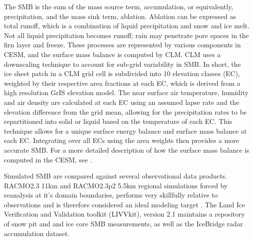 \documentclass[draft]{agujournal2019}
\begin{document}
The SMB is the sum of the mass source term, accumulation, or equivalently, precipitation, and the mass sink term, ablation. Ablation can be expressed as total runoff, which is a combination of liquid precipitation and snow and ice melt. Not all liquid precipitation becomes runoff; rain may penetrate pore spaces in the firn layer and freeze. These processes are represented by various components in CESM, and the surface mass balance is computed by CLM. CLM uses a downscaling technique to account for sub-grid variability in SMB. In short, the ice sheet patch in a CLM grid cell is subdivided into 10 elevation classes (EC), weighted by their respective area fractions at each EC, which is derived from a high resolution GrIS elevation model. The near surface air temperature, humidity and air density are calculated at each EC using an assumed lapse rate and the elevation difference from the grid mean, allowing for the precipitation rates to be repartitioned into solid or liquid based on the temperature of each EC. This technique allows for a unique surface energy balance and surface mass balance at each EC. Integrating over all ECs using the area weights then provides a more accurate SMB. For a more detailed description of how the surface mass balance is computed in the CESM, see \cite{KETAL2020JAMES}.

Simulated SMB are compared against several observational data products. RACMO2.3 11km and RACMO2.3p2 5.5km regional simulations forced by reanalysis at it's domain boundaries, performs very skillfully relative to observations and is therefore considered an ideal modeling target \cite{NETAL2019SCIENCE}. The Land Ice Verification and Validation toolkit (LIVVkit), version 2.1 \cite{LIVVkit} maintains a repository of snow pit and and ice core SMB measurements, as well as the IceBridge radar accumulation dataset.
\end{document}
